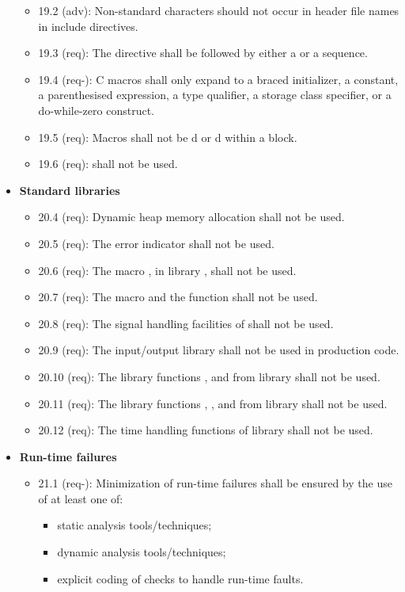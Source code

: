 \begin{itemize}
\begin{itemize}
\item 19.2 (adv): Non-standard characters should not occur in header file names in include directives.
\item 19.3 (req): The  directive shall be followed by either a  or a  sequence.
\item 19.4 (req-): C macros shall only expand to a braced initializer, a constant, a parenthesised expression, a type qualifier, a storage class specifier, or a do-while-zero construct.
\item 19.5 (req): Macros shall not be d or d within a block.
\item 19.6 (req):  shall not be used.
\end{itemize}
\item \textbf{Standard libraries}
\begin{itemize}
\item 20.4 (req): Dynamic heap memory allocation shall not be used.
\item 20.5 (req): The error indicator  shall not be used.
\item 20.6 (req): The macro , in library , shall not be used.
\item 20.7 (req): The  macro and the  function shall not be used.
\item 20.8 (req): The signal handling facilities of  shall not be used.
\item 20.9 (req): The input/output library  shall not be used in production code.
\item 20.10 (req): The library functions ,  and  from library  shall not be used.
\item 20.11 (req): The library functions , ,  and  from library  shall not be used.
\item 20.12 (req): The time handling functions of library  shall not be used.
\end{itemize}
\item \textbf{Run-time failures}
\begin{itemize}
\item 21.1 (req-): Minimization of run-time failures shall be ensured by the use of at least one of: 
\begin{itemize}
\item static analysis tools/techniques;
\item dynamic analysis tools/techniques;
\item explicit coding of checks to handle run-time faults.
\end{itemize}
\end{itemize}
\end{itemize}
 
